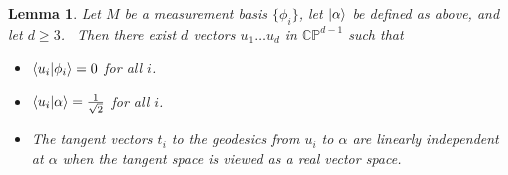 \documentclass[letterpaper,11pt]{article}
\newtheorem{lem}{Lemma}
\newcommand{\braket}[2]{\mbox{$ \langle #1 | #2 \rangle $}}
\newcommand{\ket}[1]{\mbox{$ | #1 \rangle $}}
\begin{document}
\begin{lem}
\label{ui_lemma}
Let $M$ be a measurement basis $\{\phi_i \}$, let $\ket{\alpha}$ be defined as above, and let $d\geq 3$. \ Then there exist $d$ vectors $u_1 \ldots u_d$ in $\mathbb{CP}^{d-1}$ such that
\begin{itemize}

\item $\braket{u_i}{\phi_i} =0$ for all $i$.

\item $\braket{u_i}{\alpha}=\frac{1}{\sqrt{2}}$ for all $i$.

\item The tangent vectors $t_i$ to the geodesics from $u_i$ to $\alpha$ are linearly independent at $\alpha$ when the tangent space is viewed as a real vector space.

\end{itemize}
\end{lem}
\end{document}
